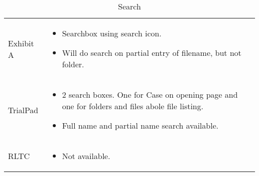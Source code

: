\begin{center}
\begin{table}[htbp]
\label{tab:Search}
  \centering
  \caption{Search}
    \begin{tabular}{|p{}|p{}|}
    \hline
    \rowcolor{lightgrey}\multicolumn{2}{c}{Search} \\
    \hline
    Exhibit A &
    \begin{itemize}
      \item Searchbox using search icon.
      \item [\color{green}\tick]\color{black}Will do search on partial entry of filename, but not folder.
    \end{itemize}\\
    \hline
    TrialPad &
    \begin{itemize}
      \item 2 search boxes. One for Case on opening page and one for folders and files abole file listing.
      \item [\color{green}\tick]\color{black}Full name and partial name search available.
    \end{itemize}\\
    \hline
    RLTC &
    \begin{itemize}
      \item [\color{red}\cross]\color{black}Not available.
    \end{itemize}\\
    \hline
\end{tabular}
\end{table}
\end{center}

\newpage
